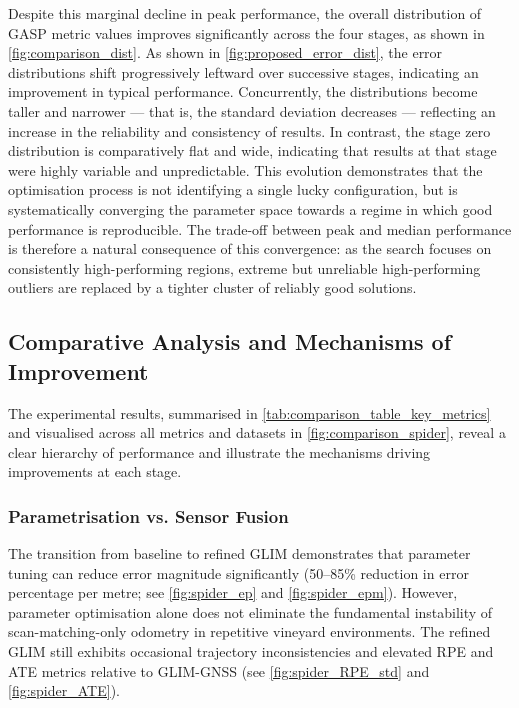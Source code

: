 Despite this marginal decline in peak performance, the overall distribution of GASP metric values improves significantly across the four stages, as shown in \cref{fig:comparison_dist}. As shown in \cref{fig:proposed_error_dist}, the error distributions shift progressively leftward over successive stages, indicating an improvement in typical performance. Concurrently, the distributions become taller and narrower — that is, the standard deviation decreases — reflecting an increase in the reliability and consistency of results. In contrast, the stage zero distribution is comparatively flat and wide, indicating that results at that stage were highly variable and unpredictable. This evolution demonstrates that the optimisation process is not identifying a single lucky configuration, but is systematically converging the parameter space towards a regime in which good performance is reproducible. The trade-off between peak and median performance is therefore a natural consequence of this convergence: as the search focuses on consistently high-performing regions, extreme but unreliable high-performing outliers are replaced by a tighter cluster of reliably good solutions.

\subsection{Comparative Analysis and Mechanisms of Improvement}

The experimental results, summarised in \cref{tab:comparison_table_key_metrics} and visualised across all metrics and datasets in \cref{fig:comparison_spider}, reveal a clear hierarchy of performance and illustrate the mechanisms driving improvements at each stage.

\subsubsection{Parametrisation vs. Sensor Fusion}

The transition from baseline to refined GLIM demonstrates that parameter tuning can reduce error magnitude significantly (50--85\% reduction in error percentage per metre; see \cref{fig:spider_ep} and \cref{fig:spider_epm}). However, parameter optimisation alone does not eliminate the fundamental instability of scan-matching-only odometry in repetitive vineyard environments. The refined GLIM still exhibits occasional trajectory inconsistencies and elevated RPE and ATE metrics relative to GLIM-GNSS (see \cref{fig:spider_RPE_std} and \cref{fig:spider_ATE}).

